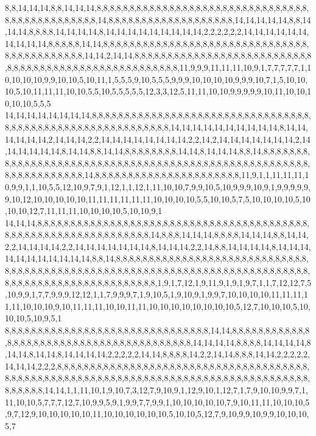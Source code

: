 8,8,14,14,14,8,8,14,14,14,8,8,8,8,8,8,8,8,8,8,8,8,8,8,8,8,8,8,8,8,8,8,8,8,8,8,8,8,8,8,8,8,8,8,8,8,8,8,8,8,8,8,8,8,8,8,14,8,8,8,8,8,8,8,8,8,8,8,8,8,8,8,8,8,8,8,14,14,14,14,14,8,8,14,14,14,8,8,8,8,14,14,14,14,8,14,14,14,14,14,14,14,14,14,2,2,2,2,2,2,14,14,14,14,14,14,14,14,14,14,8,8,8,8,8,14,14,8,8,8,8,8,8,8,8,8,8,8,8,8,8,8,8,8,8,8,8,8,8,8,8,8,8,8,8,8,8,8,8,8,8,8,8,8,8,8,8,8,8,8,14,14,2,14,14,8,8,8,8,8,8,8,8,8,8,8,8,8,8,8,8,8,8,8,8,8,8,8,8,8,8,8,8,8,8,8,8,8,8,8,8,8,8,8,8,8,8,8,8,8,8,8,8,8,8,8,8,8,11,9,9,9,11,11,11,10,9,1,7,7,7,7,7,1,10,10,10,10,9,9,10,10,5,10,11,1,5,5,5,9,10,5,5,5,9,9,9,10,10,10,10,9,9,9,10,7,1,5,10,10,10,5,10,11,11,11,10,10,5,5,10,5,5,5,5,5,12,3,3,12,5,11,11,10,10,9,9,9,9,9,10,11,10,10,10,10,10,5,5,5
14,14,14,14,14,14,14,14,8,8,8,8,8,8,8,8,8,8,8,8,8,8,8,8,8,8,8,8,8,8,8,8,8,8,8,8,8,8,8,8,8,8,8,8,8,8,8,8,8,8,8,8,8,8,8,8,8,8,8,8,8,8,8,8,8,8,14,14,14,14,14,14,14,14,14,14,8,14,14,14,14,14,14,2,14,14,14,2,2,14,14,14,14,14,14,14,14,2,2,14,2,14,14,14,14,14,14,14,2,14,14,14,14,14,14,8,14,14,8,8,14,14,8,8,8,8,8,8,8,8,14,14,8,14,14,14,8,8,14,8,8,8,8,8,8,8,8,8,8,8,8,8,8,8,8,8,8,8,8,8,8,8,8,8,8,8,8,8,8,8,8,8,8,8,8,8,8,8,8,8,8,8,8,8,8,8,8,8,8,8,8,8,8,8,8,8,8,8,8,8,8,8,8,8,14,8,8,8,8,8,8,8,8,8,8,8,8,8,8,8,8,8,8,8,8,8,8,11,9,1,1,11,11,11,10,9,9,1,1,10,5,5,12,10,9,7,9,1,12,1,1,12,1,11,10,10,7,9,9,10,5,10,9,9,9,10,9,1,9,9,9,9,9,9,10,12,10,10,10,10,10,11,11,11,11,11,11,10,10,10,10,5,5,10,10,5,7,5,10,10,10,10,5,10,10,10,12,7,11,11,11,10,10,10,10,5,10,10,9,1
14,14,14,8,8,8,8,8,8,8,8,8,8,8,8,8,8,8,8,8,8,8,8,8,8,8,8,8,8,8,8,8,8,8,8,8,8,8,8,8,8,8,8,8,8,8,8,8,8,8,8,8,8,8,8,8,8,8,8,8,8,8,8,8,8,8,14,8,8,8,14,14,14,8,8,8,8,14,14,14,8,8,14,14,2,2,14,14,14,14,2,2,14,14,14,14,14,14,14,8,14,14,14,2,2,14,8,8,14,14,14,14,8,14,14,14,14,14,14,14,14,14,14,14,8,8,14,8,8,8,8,8,8,8,8,8,8,8,8,8,8,8,8,8,8,8,8,8,8,8,8,8,8,8,8,8,8,8,8,8,8,8,8,8,8,8,8,8,8,8,8,8,8,8,8,8,8,8,8,8,8,8,8,8,8,8,8,8,8,8,8,8,8,8,8,8,8,8,8,8,8,8,8,8,8,8,8,8,8,8,8,8,8,8,8,8,8,8,8,8,8,8,8,8,8,1,9,1,7,12,1,9,11,9,1,9,1,9,7,1,1,7,12,12,7,5,10,9,9,1,7,7,9,9,9,12,12,1,1,7,9,9,9,7,1,9,10,5,1,9,10,9,1,9,9,7,10,10,10,10,11,11,11,11,11,10,10,10,9,10,11,11,11,10,10,11,11,10,10,10,10,10,10,10,10,5,12,7,10,10,10,5,10,10,10,5,10,9,5,1
8,8,8,8,8,8,8,8,8,8,8,8,8,8,8,8,8,8,8,8,8,8,8,8,8,8,8,8,8,8,8,14,14,8,8,8,8,8,8,8,8,8,8,8,8,8,8,8,8,8,8,8,8,8,8,8,8,8,8,8,8,8,8,8,8,8,8,8,8,8,8,8,8,14,14,14,14,8,8,8,8,14,14,14,14,8,14,14,8,14,14,8,14,14,14,14,2,2,2,2,2,14,14,8,8,8,8,14,2,2,14,14,8,8,8,14,14,2,2,2,2,2,14,14,14,2,2,2,8,8,8,8,8,8,8,8,8,8,8,8,8,8,8,8,8,8,8,8,8,8,8,8,8,8,8,8,8,8,8,8,8,8,8,8,8,8,8,8,8,8,8,8,8,8,8,8,8,8,8,8,8,8,8,8,8,8,8,8,8,8,8,8,8,8,8,8,8,8,8,8,8,8,8,8,8,8,8,8,8,8,8,8,8,8,8,8,8,8,14,14,1,1,11,10,1,9,10,7,3,12,7,9,10,9,1,12,9,10,1,12,7,1,7,9,10,10,9,9,7,1,11,10,10,5,7,7,7,12,7,10,9,9,5,9,1,9,9,7,7,9,9,1,10,10,10,10,10,7,9,10,11,11,10,10,10,5,9,7,12,9,10,10,10,10,10,11,10,10,10,10,10,10,5,10,10,5,12,7,9,10,9,9,10,9,9,10,10,10,5,7
